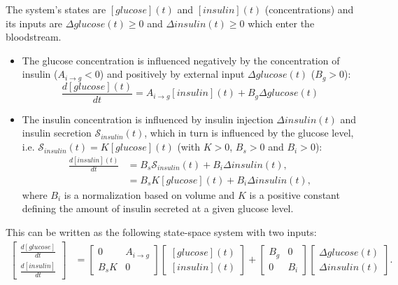 The system's states are $[glucose](t)$ and $[insulin](t)$ (concentrations) and its inputs are $\Delta glucose(t) \geq 0$ and $\Delta insulin(t) \geq 0$ which enter the bloodstream. 
\begin{itemize}
\item The glucose concentration is influenced negatively by the concentration of insulin ($A_{i\rightarrow g} < 0$) and positively by external input $\Delta glucose(t)$ ($B_g > 0$):
\begin{equation*}
\frac{d [glucose](t)}{d t} = A_{i\rightarrow g} [insulin](t) + B_g \Delta glucose(t)
\end{equation*}
\item The insulin concentration is influenced by insulin injection $\Delta insulin(t)$ and insulin secretion $\mathcal{S}_{insulin}(t)$, which in turn is influenced by the glucose level, i.e. $\mathcal{S}_{insulin}(t) = K[glucose](t)$ (with $K > 0$, $B_s > 0$ and $B_i > 0$):
\begin{align*}
\frac{d [insulin](t)}{d t} &= B_s \mathcal{S}_{insulin}(t) + B_i \Delta insulin(t), \\
        &= B_s K [glucose](t) + B_i \Delta insulin(t),
\end{align*}
where $B_i$ is a normalization based on volume and $K$ is a positive constant defining the amount of insulin secreted at a given glucose level.
\end{itemize}

This can be written as the following state-space system with two inputs:
\begin{align*}
\begin{bmatrix}
\frac{d [glucose]}{d t} \\
\frac{d [insulin]}{d t}
\end{bmatrix}
&= 
\begin{bmatrix}
0                    & A_{i\rightarrow g} \\
B_s K   & 0
\end{bmatrix}
\begin{bmatrix}
[glucose](t) \\
[insulin](t)
\end{bmatrix}
+
\begin{bmatrix}
B_g & 0 \\
0   & B_i
\end{bmatrix} 
\begin{bmatrix} 
\Delta glucose(t) \\
\Delta insulin(t)
\end{bmatrix}.
\end{align*}

